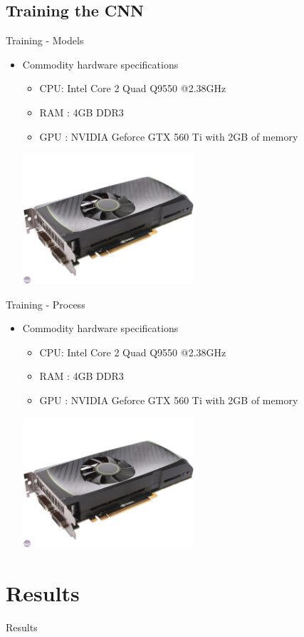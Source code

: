 \documentclass[slidestop,compress,mathserif,notes]{beamer}
\begin{document}
\subsection{Training the CNN}
\begin{frame}{Training - Models}
    \begin{itemize}
        \item Commodity hardware specifications
        \begin{itemize}
            \item CPU: Intel Core 2 Quad Q9550 @2.38GHz
            \item RAM : 4GB DDR3
            \item GPU : NVIDIA Geforce GTX 560 Ti with 2GB of memory
        \end{itemize}
        \centering
        \includegraphics[width=0.5\textwidth]{pic/gtx560.jpg}
    \end{itemize}
\end{frame}

\begin{frame}{Training - Process}
    \begin{itemize}
        \item Commodity hardware specifications
        \begin{itemize}
            \item CPU: Intel Core 2 Quad Q9550 @2.38GHz
            \item RAM : 4GB DDR3
            \item GPU : NVIDIA Geforce GTX 560 Ti with 2GB of memory
        \end{itemize}
        \centering
        \includegraphics[width=0.5\textwidth]{pic/gtx560.jpg}
    \end{itemize}
\end{frame}

\section{Results}
\begin{frame}{Results}
\end{frame}
\end{document}
